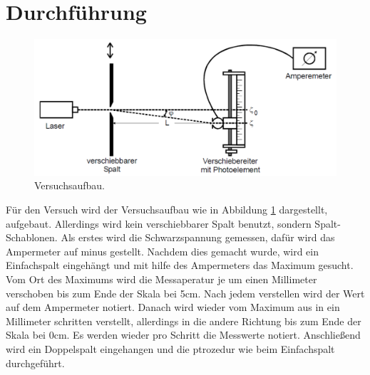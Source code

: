\section{Durchführung}
\label{sec:Durchführung}
\begin{figure}[H]
    \centering
    \includegraphics{Versuchsaufbau.png}
    \caption{Versuchsaufbau.}
    \label{fig:d}
\end{figure}
Für den Versuch wird der Versuchsaufbau wie in Abbildung \ref{fig:d} dargestellt, aufgebaut. 
Allerdings wird kein verschiebbarer Spalt benutzt, sondern Spalt-Schablonen.
Als erstes wird die Schwarzspannung gemessen, dafür wird das Ampermeter auf minus gestellt. 
Nachdem dies gemacht wurde, wird ein Einfachspalt eingehängt und mit hilfe des Ampermeters das Maximum gesucht. 
Vom Ort des Maximums wird die Messaperatur je um einen Millimeter verschoben bis zum Ende der Skala bei 5cm. 
Nach jedem verstellen wird der Wert auf dem Ampermeter notiert. Danach wird wieder vom Maximum aus in ein Millimeter schritten 
verstellt, allerdings in die andere Richtung bis zum Ende der Skala bei 0cm. Es werden wieder pro Schritt die Messwerte notiert.
Anschließend wird ein Doppelspalt eingehangen und die ptrozedur wie beim Einfachspalt durchgeführt.
